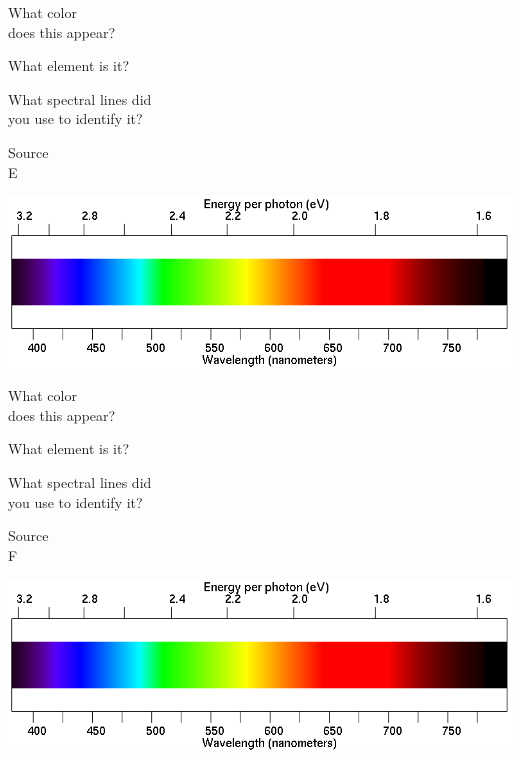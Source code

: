 \documentclass[11pt]{article}
\begin{document}
\begin{minipage}{0.33\textwidth}
	What color \\does this appear?
\end{minipage}
\begin{minipage}{0.33\textwidth}
	What element is it?
\end{minipage}
\begin{minipage}{0.33\textwidth}
	What spectral lines did\\
	you use to identify it?
\end{minipage}

\vspace{1.2in}

\begin{minipage}{0.1\textwidth}
	\begin{center}
		\Large Source \\ E
	\end{center}
\end{minipage}
\begin{minipage}{0.7\textwidth}
	\includegraphics[width=\textwidth]{spectrum2.png}
\end{minipage}

\begin{minipage}{0.33\textwidth}
	What color \\does this appear?
\end{minipage}
\begin{minipage}{0.33\textwidth}
	What element is it?
\end{minipage}
\begin{minipage}{0.33\textwidth}
	What spectral lines did\\
	you use to identify it?
\end{minipage}

\vspace{1.0in}

\begin{minipage}{0.1\textwidth}
	\begin{center}
		\Large Source \\ F
	\end{center}
\end{minipage}
\begin{minipage}{0.7\textwidth}
	\includegraphics[width=\textwidth]{spectrum2.png}
\end{minipage}
\end{document}

